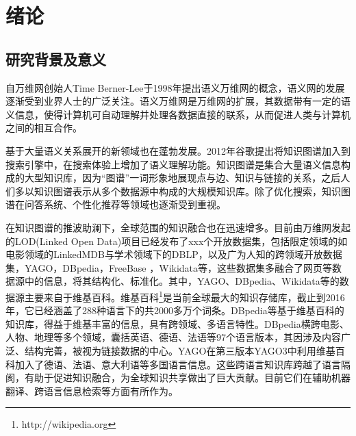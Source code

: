 \chapter{绪论}
\label{cha:intro}

\section{研究背景及意义}

自万维网创始人Time Berner-Lee于1998年提出语义万维网的概念\cite{berners1998semantic}，语义网的发展逐渐受到业界人士的广泛关注。语义万维网是万维网的扩展，其数据带有一定的语义信息，使得计算机可自动理解并处理各数据直接的联系，从而促进人类与计算机之间的相互合作。

基于大量语义关系展开的新领域也在蓬勃发展。2012年谷歌提出将知识图谱\cite{singhal2012introducing}加入到搜索引擎中，在搜索体验上增加了语义理解功能。知识图谱是集合大量语义信息构成的大型知识库，因为“图谱”一词形象地展现点与边、知识与链接的关系，之后人们多以知识图谱表示从多个数据源中构成的大规模知识库。除了优化搜索，知识图谱在问答系统\cite{yih2015semantic,yang2014joint}、个性化推荐\cite{kaminskas2012knowledge}等领域也逐渐受到重视。

在知识图谱的推波助澜下，全球范围的知识融合也在迅速增多。目前由万维网发起的LOD(Linked Open Data)项目已经发布了xxx个开放数据集，包括限定领域的如电影领域的LinkedMDB\cite{hassanzadeh2009linked}与学术领域下的DBLP，以及广为人知的跨领域开放数据集，YAGO\cite{suchanek2007yago,suchanek2008yago,hoffart2013yago2,mahdisoltani2014yago3}，DBpedia\cite{auer2007dbpedia,bizer2009dbpedia,lehmann2015dbpedia}，FreeBase \cite{bollacker2008freebase}，Wikidata\cite{vrandevcic2014wikidata,erxleben2014introducing}等，这些数据集多融合了网页等数据源中的信息，将其结构化、标准化。其中，YAGO、DBpedia、Wikidata等的数据源主要来自于维基百科。维基百科\footnote{http://wikipedia.org}是当前全球最大的知识存储库，截止到2016年，它已经涵盖了288种语言下的共2000多万个词条。DBpedia等基于维基百科的知识库，得益于维基丰富的信息，具有跨领域、多语言特性。DBpedia横跨电影、人物、地理等多个领域，囊括英语、德语、法语等97个语言版本，其因涉及内容广泛、结构完善，被视为链接数据的中心。YAGO在第三版本YAGO3中利用维基百科加入了德语、法语、意大利语等多国语言信息。这些跨语言知识库跨越了语言隔阂，有助于促进知识融合，为全球知识共享做出了巨大贡献。目前它们在辅助机器翻译\cite{niehues2011using}、跨语言信息检索\cite{giang2015building}等方面有所作为。

